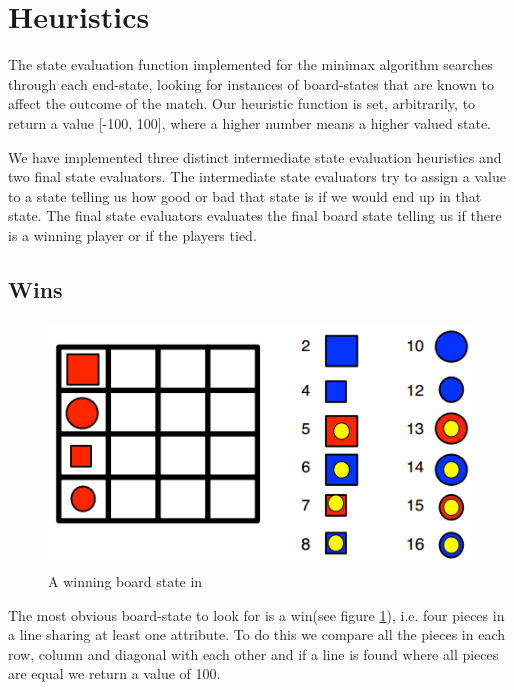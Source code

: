 \section{Heuristics}\label{heuristics}
The state evaluation function implemented for the minimax algorithm searches 
through each end-state, looking for instances of board-states that are known  
to affect the outcome of the match.
Our heuristic function is set, arbitrarily, to return a value [-100, 100], 
where a higher number means a higher valued state.

We have implemented three distinct intermediate state evaluation heuristics
and two final state evaluators. The intermediate state evaluators try to assign
a value to a state telling us how good or bad that state is if we would end up
in that state. The final state evaluators evaluates the final board state telling
us if there is a winning player or if the players tied.

\subsection{Wins}\label{win}
\begin{figure}[htb]
\includegraphics{pictures/win.png}
\caption[A \quarto{} win]{A winning board state in \quarto{}}
\label{fig:win}
\end{figure}
The most obvious board-state to look for is a win(see figure \ref{fig:win}), 
i.e. four pieces in a line  
sharing at least one attribute. To do this we compare all the pieces in each 
row, column and diagonal with each other and if a line is found where all 
pieces are equal we return a value of 100.


